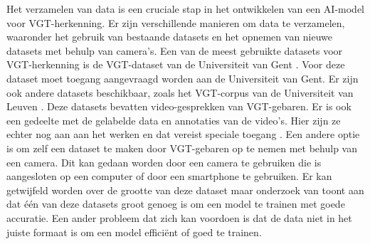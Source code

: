 Het verzamelen van data is een cruciale stap in het ontwikkelen van een AI-model voor VGT-herkenning.
Er zijn verschillende manieren om data te verzamelen, waaronder het gebruik van bestaande datasets en het opnemen van nieuwe datasets met behulp van camera's.
Een van de meest gebruikte datasets voor VGT-herkenning is de VGT-dataset van de Universiteit van Gent \autocite{VGT_Signbank}.
Voor deze dataset moet toegang aangevraagd worden aan de Universiteit van Gent.
Er zijn ook andere datasets beschikbaar, zoals het VGT-corpus van de Universiteit van Leuven \textcite{Corpus_VGT}.
Deze datasets bevatten video-gesprekken van VGT-gebaren.
Er is ook een gedeelte met de gelabelde data en annotaties van de video's.
Hier zijn ze echter nog aan aan het werken en dat vereist speciale toegang \autocite{Over_het_Corpus_VGT}.
Een andere optie is om zelf een dataset te maken door VGT-gebaren op te nemen met behulp van een camera.
Dit kan gedaan worden door een camera te gebruiken die is aangesloten op een computer of door een smartphone te gebruiken.
Er kan getwijfeld worden over de grootte van deze dataset maar onderzoek van \textcite{Coster2023} toont aan dat {\'e}{\'e}n van deze datasets groot genoeg is om een model te trainen met goede accuratie.
Een ander probleem dat zich kan voordoen is dat de data niet in het juiste formaat is om een model effici{\"e}nt of goed te trainen\autocite{Vandeghinste2024}.


